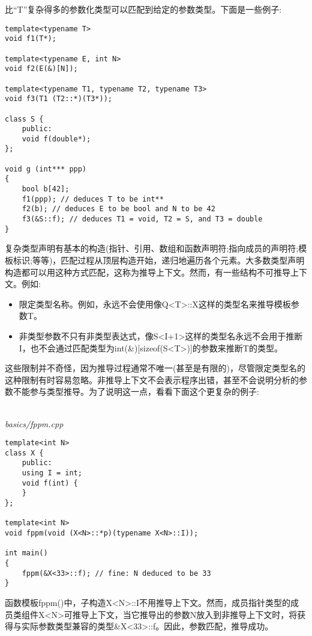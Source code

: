 比“T”复杂得多的参数化类型可以匹配到给定的参数类型。下面是一些例子:

\begin{lstlisting}[style=styleCXX]
template<typename T>
void f1(T*);

template<typename E, int N>
void f2(E(&)[N]);

template<typename T1, typename T2, typename T3>
void f3(T1 (T2::*)(T3*));

class S {
	public:
	void f(double*);
};

void g (int*** ppp)
{
	bool b[42];
	f1(ppp); // deduces T to be int**
	f2(b); // deduces E to be bool and N to be 42
	f3(&S::f); // deduces T1 = void, T2 = S, and T3 = double
}
\end{lstlisting} 

复杂类型声明有基本的构造(指针、引用、数组和函数声明符;指向成员的声明符;模板标识;等等)，匹配过程从顶层构造开始，递归地遍历各个元素。大多数类型声明构造都可以用这种方式匹配，这称为推导上下文。然而，有一些结构不可推导上下文。例如:

\begin{itemize}
\item 
限定类型名称。例如，永远不会使用像Q<T>::X这样的类型名来推导模板参数T。

\item 
非类型参数不只有非类型表达式，像S<I+1>这样的类型名永远不会用于推断I，也不会通过匹配类型为int(\&)[sizeof(S<T>)]的参数来推断T的类型。
\end{itemize}

这些限制并不奇怪，因为推导过程通常不唯一(甚至是有限的)，尽管限定类型名的这种限制有时容易忽略。非推导上下文不会表示程序出错，甚至不会说明分析的参数不能参与类型推导。为了说明这一点，看看下面这个更复杂的例子:

\hspace*{\fill} \\ %
\noindent
\textit{basics/fppm.cpp}
\begin{lstlisting}[style=styleCXX]
template<int N>
class X {
	public:
	using I = int;
	void f(int) {
	}
};

template<int N>
void fppm(void (X<N>::*p)(typename X<N>::I));

int main()
{
	fppm(&X<33>::f); // fine: N deduced to be 33
}
\end{lstlisting}

函数模板fppm()中，子构造X<N>::I不用推导上下文。然而，成员指针类型的成员类组件X<N>可推导上下文，当它推导出的参数N放入到非推导上下文时，将获得与实际参数类型兼容的类型\&X<33>::f。因此，参数匹配，推导成功。

